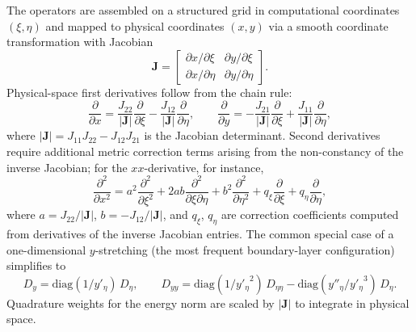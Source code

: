 \documentclass[11pt]{article}
\newcommand{\pp}{\partial}
\begin{document}
The operators are assembled on a structured grid in computational coordinates $(\xi,\eta)$ and mapped to physical coordinates $(x,y)$ via a smooth coordinate transformation with Jacobian
\begin{equation}
  \mathbf{J} =
  \begin{bmatrix}
    \pp x/\pp\xi & \pp y/\pp\xi \\
    \pp x/\pp\eta & \pp y/\pp\eta
  \end{bmatrix}.
  \label{eq:jacobian}
\end{equation}
Physical-space first derivatives follow from the chain rule:
\begin{equation}
  \frac{\pp}{\pp x}
  = \frac{J_{22}}{|\mathbf{J}|}\frac{\pp}{\pp\xi}
  - \frac{J_{12}}{|\mathbf{J}|}\frac{\pp}{\pp\eta},
  \qquad
  \frac{\pp}{\pp y}
  = -\frac{J_{21}}{|\mathbf{J}|}\frac{\pp}{\pp\xi}
  + \frac{J_{11}}{|\mathbf{J}|}\frac{\pp}{\pp\eta},
  \label{eq:curv_first}
\end{equation}
where $|\mathbf{J}| = J_{11}J_{22} - J_{12}J_{21}$ is the Jacobian determinant.
Second derivatives require additional metric correction terms arising from the non-constancy of the inverse Jacobian; for the $xx$-derivative, for instance,
\begin{equation}
  \frac{\pp^2}{\pp x^2}
  = a^2\frac{\pp^2}{\pp\xi^2}
  + 2ab\frac{\pp^2}{\pp\xi\pp\eta}
  + b^2\frac{\pp^2}{\pp\eta^2}
  + q_{\xi}\frac{\pp}{\pp\xi}
  + q_{\eta}\frac{\pp}{\pp\eta},
  \label{eq:curv_second}
\end{equation}
where $a = J_{22}/|\mathbf{J}|$, $b = -J_{12}/|\mathbf{J}|$, and $q_\xi$, $q_\eta$ are correction coefficients computed from derivatives of the inverse Jacobian entries.
The common special case of a one-dimensional $y$-stretching (the most frequent boundary-layer configuration) simplifies to
\begin{equation}
  D_y = \mathrm{diag}(1/y'_\eta)\,D_\eta,
  \qquad
  D_{yy} = \mathrm{diag}(1/{y'_\eta}^2)\,D_{\eta\eta}
         - \mathrm{diag}(y''_\eta/{y'_\eta}^3)\,D_\eta.
  \label{eq:1d_stretch}
\end{equation}
Quadrature weights for the energy norm are scaled by $|\mathbf{J}|$ to integrate in physical space.
\end{document}
